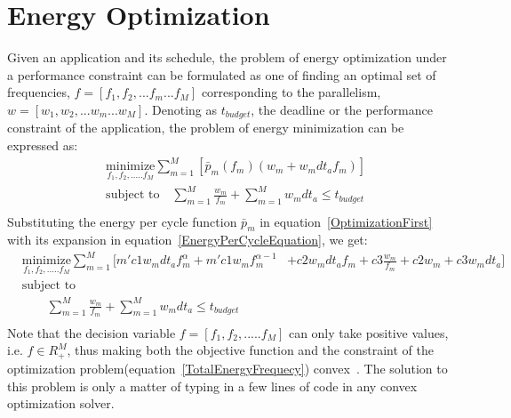 \documentclass[11pt, letterpaper]{article}
\begin{document}
\section{Energy Optimization}\label{EnergyOptimizationProblem}
Given an application and its schedule, the problem of energy optimization under a performance constraint can be formulated as one of finding an optimal set of frequencies, $f = [f_1 , f_2 , ...f_m ...f_M ]$  corresponding to the parallelism, $w =[w_1 , w_2, ...w_m ...w_M ]$. Denoting as $t_{budget}$, the deadline or the performance constraint of the application, the problem of energy minimization can be expressed as: 
\begin{equation}\label{OptimizationFirst}
\begin{aligned}
   &\underset{f_1, f_2, .....f_M}{\text{minimize}} \sum_{m=1}^{M}[\bar{p}_m(f_m)(w_m + w_m dt_af_m)] \\
   & \text{subject to} \quad \sum_{m=1}^{M}\frac{w_m}{f_m} + \sum_{m=1}^{M}w_mdt_a \leq t_{budget} \\
\end{aligned}
\end{equation}
Substituting the energy per cycle function $\bar{p}_m$ in equation~\ref{OptimizationFirst} with its expansion in equation~\ref{EnergyPerCycleEquation}, we get:
\begin{equation}\label{TotalEnergyFrequecy}
\begin{aligned}
   &\underset{f_1, f_2, .....f_M}{\text{minimize}} \sum_{m=1}^{M}[m'c1w_mdt_af_m^{\alpha} + m'c1w_mf_m^{\alpha-1}
 &+ c2w_mdt_af_m + c3\frac{w_m}{f_m} +c2w_m + c3w_mdt_a]\\
 & \text{subject to} \\
 &\qquad  \sum_{m=1}^{M}\frac{w_m}{f_m} + \sum_{m=1}^{M}w_mdt_a \leq t_{budget} \\
\end{aligned}
 \end{equation}
 Note that the decision variable $f = [f_1, f_2, .....f_M]$ can only take positive values, i.e. $f \in R_{+}^M$, thus making both the objective function and the constraint of the optimization problem(equation~\ref{TotalEnergyFrequecy}) convex~\cite{Boyd}. The solution to this problem is only a matter of typing in a few lines of code in any convex optimization solver.
\end{document}
